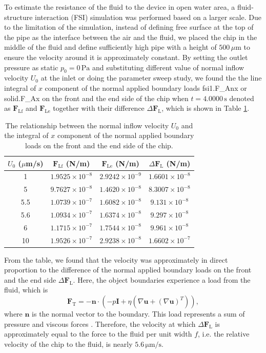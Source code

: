 \documentclass[journal,svgnames,twocolumn,x11names]{IEEEtran}
\begin{document}
To estimate the resistance of the fluid to the device in open water area, a fluid-structure interaction (FSI) simulation was performed based on a larger scale. Due to the limitation of the simulation, instead of defining free surface at the top of the pipe as the interface between the air and the fluid, we placed the chip in the middle of the fluid and define sufficiently high pipe with a height of $500\,\mu\text{m}$ to ensure the velocity around it is approximately constant. By setting the outlet pressure as static $p_0=0\,\text{Pa}$ and substituting different value of normal inflow velocity $U_0$ at the inlet or doing the parameter sweep study, we found the the line integral of $x$ component of the normal applied boundary loads fsi1.F\_Anx or solid.F\_Ax on the front and the end side of the chip when $t=4.0000\,\text{s}$ denoted as $\mathbf{F}_\text{Lf}$ and $\mathbf{F}_\text{Le}$ together with their difference $\Delta\mathbf{F}_\text{L}$, which is shown in Table \ref{tab:v-loads}.
\begin{table}[H]
    \centering
    \begin{tabular}{|c|c|c|c|}
        \hline
        $U_0$ ($\mu$m/s)&$\mathbf{F}_\text{Lf}$ (N/m)&$\mathbf{F}_\text{Le}$ (N/m)&$\Delta\mathbf{F}_\text{L}$ (N/m)\\
        \hline
        1&$1.9525\times10^{-8}$&$2.9242\times10^{-9}$&$1.6601\times10^{-8}$\\
        \hline
        5&$9.7627\times10^{-8}$&$1.4620\times10^{-8}$&$8.3007\times10^{-8}$\\
        \hline
        5.5&$1.0739\times10^{-7}$&$1.6082\times10^{-8}$&$9.131\times10^{-8}$\\
        \hline
        5.6&$1.0934\times10^{-7}$&$1.6374\times10^{-8}$&$9.297\times10^{-8}$\\
        \hline
        6&$1.1715\times10^{-7}$&$1.7544\times10^{-8}$&$9.961\times10^{-8}$\\
        \hline
        10&$1.9526\times10^{-7}$&$2.9238\times10^{-8}$&$1.6602\times10^{-7}$\\
        \hline
    \end{tabular}
    \caption{The relationship between the normal inflow velocity $U_0$ and the integral of $x$ component of the normal applied boundary loads on the front and the end side of the chip.}
    \label{tab:v-loads}
    \vspace{-0.5cm}
\end{table}
From the table, we found that the velocity was approximately in direct proportion to the difference of the normal applied boundary loads on the front and the end side $\Delta\mathbf{F}_\text{L}$. Here, the object boundaries experience a load from the fluid, which is
\begin{equation}
    \mathbf{F}_\mathrm{T}=-\mathbf{n}\cdot(-p\mathbf{I}+\eta(\nabla\mathbf{u}+(\nabla\mathbf{u})^T)),
\end{equation}
where $\mathbf{n}$ is the normal vector to the boundary. This load represents a sum of pressure and viscous forces \cite{wang2007benchmarking}. Therefore, the velocity at which $\Delta\mathbf{F}_\text{L}$ is approximately equal to the force to the fluid per unit width $f$, i.e. the relative velocity of the chip to the fluid, is nearly $5.6\,\mathrm{\mu m/s}$.
\end{document}
